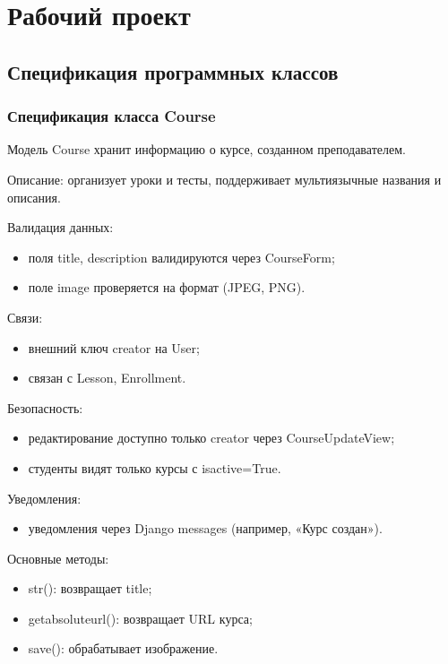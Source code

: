 \section{Рабочий проект}

\subsection{Спецификация программных классов}

\subsubsection{Спецификация класса Course}
Модель Course хранит информацию о курсе, созданном преподавателем.

Описание: организует уроки и тесты, поддерживает мультиязычные названия и описания.

Валидация данных:
	\begin{itemize}
		\item поля title, description валидируются через CourseForm;
		\item поле image проверяется на формат (JPEG, PNG).
	\end{itemize}
	
Связи:
	\begin{itemize}
		\item внешний ключ creator на User;
		\item связан с Lesson, Enrollment.
	\end{itemize}
		
Безопасность:
	\begin{itemize}
		\item редактирование доступно только creator через CourseUpdateView;
		\item студенты видят только курсы с isactive=True.
	\end{itemize}
	
Уведомления:
	\begin{itemize}
		\item уведомления через Django messages (например, «Курс создан»).
	\end{itemize}
	
Основные методы:
	\begin{itemize}
		\item str(): возвращает title;
		\item getabsoluteurl(): возвращает URL курса;
		\item save(): обрабатывает изображение.
	\end{itemize}
	
